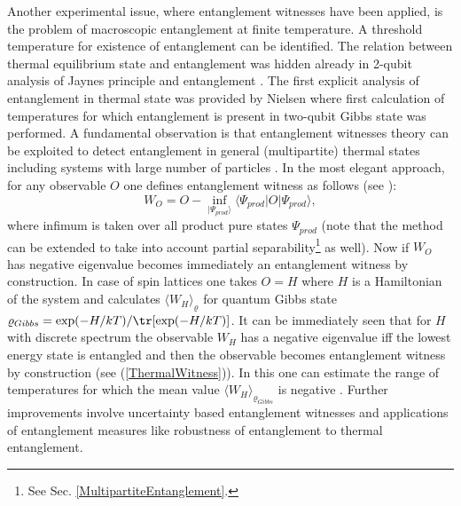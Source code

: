 \documentclass[rmp,12pt,preprint]{revtex4-2}
\begin{document}
Another experimental issue, where entanglement witnesses have been
applied, is the problem of macroscopic entanglement at finite
temperature. A threshold temperature for existence of entanglement can
be identified. The relation between thermal equilibrium state and
entanglement was hidden already in 2-qubit analysis of Jaynes
principle and entanglement \cite{Jaynes}. The first explicit analysis
of entanglement in thermal state was provided by Nielsen
\cite{NielsenPhD} where first calculation of temperatures for which
entanglement is present in two-qubit Gibbs state was performed. A
fundamental observation is that entanglement witnesses theory can be
exploited to detect entanglement in general (multipartite) thermal
states including systems with large number of particles
\cite{BrucknerVedralTemperature,TothTemperature}. In the most elegant
approach, for any observable $O$ one defines entanglement witness as
follows (see \cite{TothTemperature}):
\begin{equation}
W_{O}=O-\inf_{|\Psi_{prod}\rangle} \langle
\Psi_{prod}|O|\Psi_{prod}\rangle, \label{ThermalWitness}
\end{equation}
where infimum is taken over all product pure states $\Psi_{prod}$
(note that the method can be extended to take into account partial
separability\footnote{See Sec.  \ref{MultipartiteEntanglement}.} as
well). Now if $W_{O}$ has negative eigenvalue becomes immediately an
entanglement witness by construction. In case of spin lattices one
takes $O=H$ where $H$ is a Hamiltonian of the system and calculates
$\langle W_{H}\rangle_{\varrho}$ for quantum Gibbs state
$\varrho_{Gibbs}=\exp(-H/kT)/{\tr}[\exp(-H/kT)]$. It can be
immediately seen that for $H$ with discrete spectrum the observable
$W_{H}$ has a negative eigenvalue iff the lowest energy state is
entangled and then the observable becomes entanglement witness by
construction (see (\ref{ThermalWitness})). In this one can estimate
the range of temperatures for which the mean value $\langle
W_{H}\rangle_{\varrho_{Gibbs}}$ is negative \cite{TothTemperature}.
Further improvements involve uncertainty based entanglement witnesses
\cite{AndersVedralTemperature} and applications of entanglement
measures like robustness of entanglement
\cite{MarkhamVedralTemperature} to thermal entanglement.
\end{document}
